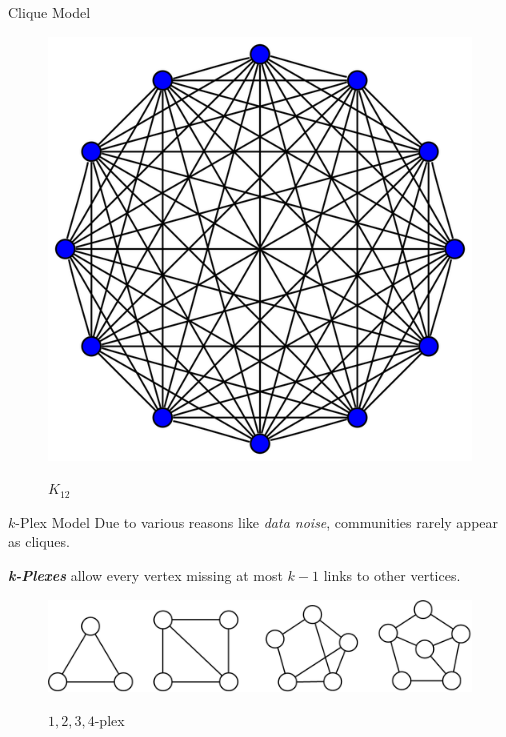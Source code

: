 \documentclass[9pt,notheorems]{beamer} %
\begin{document}
\begin{frame}{Clique Model}
\begin{minipage}{0.4\linewidth}
\begin{figure}[h]
            \includegraphics[height=.3\textheight]{pic/k12.png}\\
            \caption{$K_{12}$}
        \end{figure}
    \end{minipage}
\end{frame}
\begin{frame}{$k$-Plex Model}
    Due to various reasons like \emph{data noise}, communities rarely appear as cliques.
    
    \textbf{\emph{k-Plexes}} allow every vertex missing at most $k-1$ links to other vertices.

    \begin{figure}[h]
        \centering
        \includegraphics[width=0.8\linewidth]{pic/plexes.png}\\
        \caption{$1,2,3,4$-plex}
    \end{figure}
\end{frame}
\end{document}
